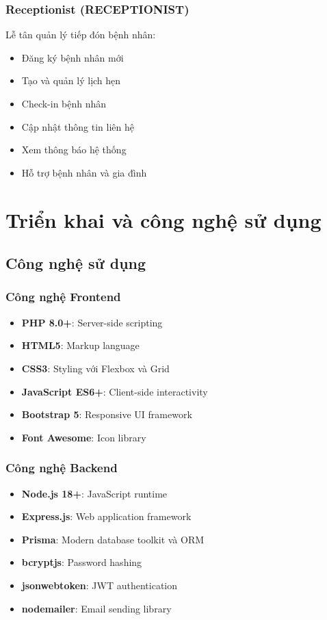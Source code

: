 \documentclass[12pt,a4paper]{report}
\begin{document}
    \subsection{Receptionist (RECEPTIONIST)}
    Lễ tân quản lý tiếp đón bệnh nhân:
    \begin{itemize}
        \item Đăng ký bệnh nhân mới
        \item Tạo và quản lý lịch hẹn
        \item Check-in bệnh nhân
        \item Cập nhật thông tin liên hệ
        \item Xem thông báo hệ thống
        \item Hỗ trợ bệnh nhân và gia đình
    \end{itemize}

    \chapter{Triển khai và công nghệ sử dụng}

    \section{Công nghệ sử dụng}

    \subsection{Công nghệ Frontend}
    \begin{itemize}
        \item \textbf{PHP 8.0+}: Server-side scripting
        \item \textbf{HTML5}: Markup language
        \item \textbf{CSS3}: Styling với Flexbox và Grid
        \item \textbf{JavaScript ES6+}: Client-side interactivity
        \item \textbf{Bootstrap 5}: Responsive UI framework
        \item \textbf{Font Awesome}: Icon library
    \end{itemize}

    \subsection{Công nghệ Backend}
    \begin{itemize}
        \item \textbf{Node.js 18+}: JavaScript runtime
        \item \textbf{Express.js}: Web application framework
        \item \textbf{Prisma}: Modern database toolkit và ORM
        \item \textbf{bcryptjs}: Password hashing
        \item \textbf{jsonwebtoken}: JWT authentication
        \item \textbf{nodemailer}: Email sending library
    \end{itemize}
\end{document}
